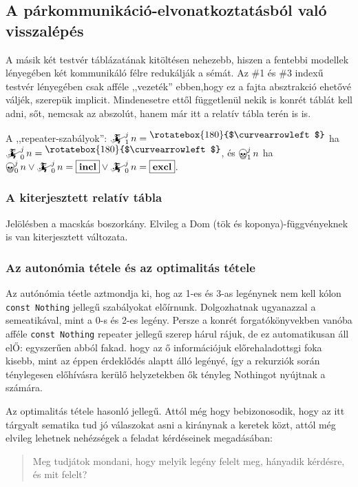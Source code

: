 \documentclass{article}
\newcommand{\nothing}{\text{\raisebox{0.4em}{\rotatebox{180}{$\curvearrowleft$}}}}%
\newcommand{\just}[1]{\boxed{#1}}%
\newcommand{\incl}{\mathbf{incl}}
\newcommand{\excl}{\mathbf{excl}}
\newcommand{\mainfun}[3]{\mathwitch_{#1}^{#2}#3}
\newcommand{\nomainfun}[3]{\bigskull_{#1}^{#2}#3}
\begin{document}
	\subsection{A párkommunikáció-elvonatkoztatásból való visszalépés}

	A másik két testvér táblázatának kitöltésen nehezebb, hiszen a fentebbi modellek lényegében két kommunikáló félre redukálják a sémát.
	Az \#1 és \#3 indexű testvér lényegében csak afféle ,,vezeték'' ebben,hogy ez a fajta absztrakció ehetővé váljék, szerepük implicit.
	Mindenesetre ettől függetlenül nekik is konrét táblát kell adni, sőt, nemcsak az abszolút, hanem már itt a relatív tábla terén is is.

	A ,,repeater-szabályok'': $\mainfun1jn = \nothing$ ha $\mainfun0jn = \nothing$, és $\nomainfun1jn$ ha $\nomainfun0jn \lor \mainfun0jn = \just\incl \lor \mainfun0jn = \just\excl$.

	\subsubsection{A kiterjesztett relatív tábla}

	Jelölésben a macskás boszorkány. Elvileg a Dom (tök és koponya)-függvényeknek is van kiterjesztett változata.

	\subsubsection{Az autonómia tétele és az optimalitás tétele}

	Az autónómia téetle aztmondja ki, hog az 1-es és 3-as legénynek nem kell kólon \texttt{const Nothing} jellegű szabályokat előírnunk.
	Dolgozhatnak ugyanazzal a semeatikával, mint a 0-s és 2-es legény. Persze a konrét forgatókönyvekben vanóba afféle \texttt{const Nothing} repeater jellegű szerep hárul rájuk,
	de ez automatikusan áll elŐ: egyszerűen abból fakad. hogy az ő információjuk előrehaladottsgi foka kisebb, mint az éppen érdeklődés alaptt álló legényé, így a rekurziók során ténylegesen előhívásra kerülő helyzetekben ők tényleg Nothingot nyújtnak a számára.

	Az optimalitás tétele hasonló jellegű. Attól még hogy bebizonosodik, hogy az itt tárgyalt sematika tud jó válaszokat asni a kiránynak a keretek közt, attól még elvileg lehetnek nehézségek a feladat kérdéseinek megadásában:

	\begin{quotation}
		Meg tudjátok mondani, hogy melyik legény felelt meg, hányadik kérdésre, és mit felelt?
	\end{quotation}
\end{document}
